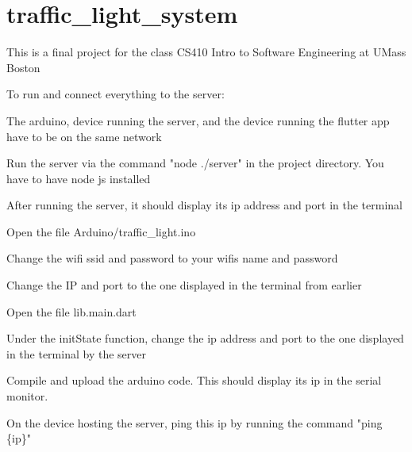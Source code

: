 \chapter{traffic\+\_\+light\+\_\+system }
\hypertarget{md__r_e_a_d_m_e}{}\label{md__r_e_a_d_m_e}
\label{md__r_e_a_d_m_e_autotoc_md0}%
%


This is a final project for the class CS410 Intro to Software Engineering at UMass Boston

To run and connect everything to the server\+:
\begin{DoxyItemize}
\item The arduino, device running the server, and the device running the flutter app have to be on the same network
\item Run the server via the command "{}node ./server"{} in the project directory. You have to have node js installed
\item After running the server, it should display its ip address and port in the terminal
\item Open the file Arduino/traffic\+\_\+light.\+ino
\begin{DoxyItemize}
\item Change the wifi ssid and password to your wifi\textquotesingle{}s name and password
\item Change the IP and port to the one displayed in the terminal from earlier
\end{DoxyItemize}
\item Open the file lib.\+main.\+dart
\begin{DoxyItemize}
\item Under the init\+State function, change the ip address and port to the one displayed in the terminal by the server
\end{DoxyItemize}
\item Compile and upload the arduino code. This should display it\textquotesingle{}s ip in the serial monitor.
\item On the device hosting the server, ping this ip by running the command "{}ping \{ip\}"{} 
\end{DoxyItemize}